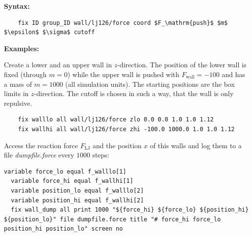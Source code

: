 {\bfseries Syntax:}

\begin{lstlisting}
    fix ID group_ID wall/lj126/force coord $F_\mathrm{push}$ $m$ $\epsilon$ $\sigma$ cutoff
\end{lstlisting}

{\bfseries Examples:}

Create a lower and an upper wall in $z$-direction. The position of the lower wall is fixed (through $m=0$) while the upper wall is pushed with $F_\mathrm{wall} = -100$ and has a mass of $m=1000$ (all simulation units). The starting positions are the box limits in $z$-direction. The cutoff is chosen in such a way, that the wall is only repulsive.

\begin{lstlisting}
    fix walllo all wall/lj126/force zlo 0.0 0.0 1.0 1.0 1.12
    fix wallhi all wall/lj126/force zhi -100.0 1000.0 1.0 1.0 1.12
\end{lstlisting}

Access the reaction force $F_\mathrm{LJ}$ and the position $x$ of this walls and log them to a file \emph{dumpfile.force} every $1000$ steps:

\begin{lstlisting}[mathescape=false]
  variable force_lo equal f_walllo[1]
  variable force_hi equal f_wallhi[1]
  variable position_lo equal f_walllo[2]
  variable position_hi equal f_wallhi[2]
  fix wall_dump all print 1000 "${force_hi} ${force_lo} ${position_hi} ${position_lo}" file dumpfile.force title "# force_hi force_lo position_hi position_lo" screen no

\end{lstlisting}